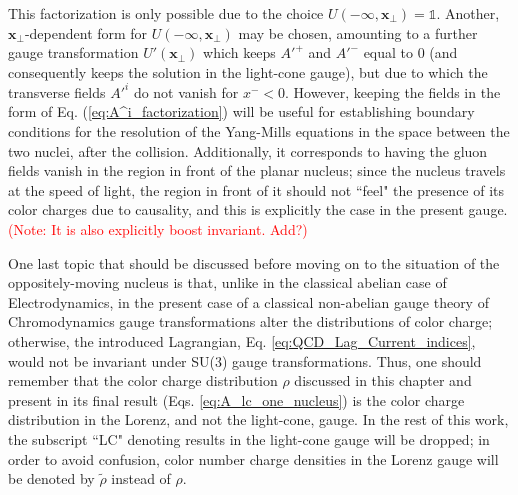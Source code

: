 
This factorization is only possible due to the choice $U(-\infty,\mathbf{x}_\perp) = \mathds{1}$. Another, $\mathbf{x}_\perp$-dependent form for $U(-\infty,\mathbf{x}_\perp)$ may be chosen, amounting to a further gauge transformation $U'(\mathbf{x}_\perp)$ which keeps $A'^+$ and $A'^-$ equal to $0$ (and consequently keeps the solution in the light-cone gauge), but due to which the transverse fields $A'^i$ do not vanish for $x^-<0$. However, keeping the fields in the form of Eq. (\ref{eq:A^i_factorization}) will be useful for establishing boundary conditions for the resolution of the Yang-Mills equations in the space between the two nuclei, after the collision. Additionally, it corresponds to having the gluon fields vanish in the region in front of the planar nucleus; since the nucleus travels at the speed of light, the region in front of it should not ``feel" the presence of its color charges due to causality, and this is explicitly the case in the present gauge. \textcolor{red}{(Note: It is also explicitly boost invariant. Add?)}

One last topic that should be discussed before moving on to the situation of the oppositely-moving nucleus is that, unlike in the classical abelian case of Electrodynamics, in the present case of a classical non-abelian gauge theory of Chromodynamics gauge transformations alter the distributions of color charge; otherwise, the introduced Lagrangian, Eq. \ref{eq:QCD_Lag_Current_indices}, would not be invariant under SU(3) gauge transformations. Thus, one should remember that the color charge distribution $\rho$ discussed in this chapter and present in its final result (Eqs. \ref{eq:A_lc_one_nucleus}) is the color charge distribution in the Lorenz, and not the light-cone, gauge. In the rest of this work, the subscript ``LC" denoting results in the light-cone gauge will be dropped; in order to avoid confusion, color number charge densities in the Lorenz gauge will be denoted by $\tilde{\rho}$ instead of $\rho$.

